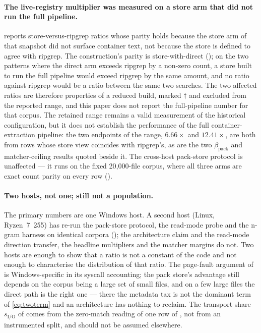 \documentclass[11pt,letterpaper]{article}
\begin{document}
\paragraph{The live-registry multiplier was measured on a store arm that did
not run the full pipeline.}
 reports store-versus-ripgrep ratios whose parity holds
because the store arm of that snapshot did not surface container text, not
because the store is defined to agree with ripgrep. The construction's parity
is store-with-direct (); on the two patterns where the
direct arm exceeds ripgrep by a non-zero count, a store built to run the full
pipeline would exceed ripgrep by the same amount, and no ratio against ripgrep
would be a ratio between the same two searches. The two affected ratios are
therefore properties of a reduced build, marked $\dagger$ and excluded from
the reported range, and this paper does not report the full-pipeline number for
that corpus. The retained range remains a valid measurement of the historical
configuration, but it does not establish the performance of the full
container-extraction pipeline: the two endpoints of the range, $6.66\times$ and
$12.41\times$, are both from rows whose store
view coincides with ripgrep's, as are the two $\beta_{\text{pack}}$ and
matcher-ceiling results quoted beside it. The cross-host pack-store protocol is
unaffected --- it runs on the fixed 20{,}000-file corpus, where all three arms
are exact count parity on every row ().

\paragraph{Two hosts, not one; still not a population.}
The primary numbers are one Windows host. A second host (Linux,
Ryzen~7~255) has re-run the pack-store protocol, the read-mode probe and
the n-gram harness on identical corpora (); the
architecture claim and the read-mode direction transfer, the headline
multipliers and the matcher margins do not. Two hosts are enough to show
that a ratio is not a constant of the code and not enough to characterise
the distribution of that ratio. The page-fault argument of
 is Windows-specific in its syscall accounting; the pack
store's advantage still depends on the corpus being a large set of small
files, and on a few large files the direct path is the right one --- there
the metadata tax is not the dominant term of \eqref{eq:twoterm} and an
architecture has nothing to reclaim. The transport share $s_{\text{I/O}}$ of
 comes from the zero-match reading of one row of
, not from an instrumented split, and should not be
assumed elsewhere.
\end{document}
